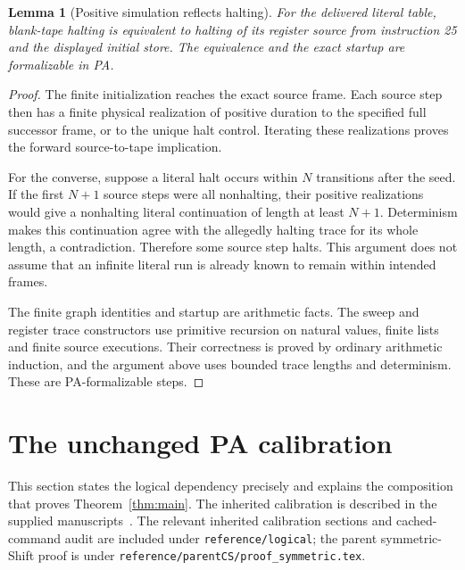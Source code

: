 \documentclass[11pt,letterpaper]{article}
\newcommand{\file}[1]{\texttt{\nolinkurl{#1}}}
\newtheorem{lemma}[theorem]{Lemma}
\begin{document}
\begin{lemma}[Positive simulation reflects halting]\label{lem:reflect}
For the delivered literal table, blank-tape halting is equivalent to
halting of its register source from instruction 25 and the displayed
initial store. The equivalence and the exact startup are formalizable in PA.
\end{lemma}
\begin{proof}
The finite initialization reaches the exact source frame. Each source
step then has a finite physical realization of positive duration to the
specified full successor frame, or to the unique halt control. Iterating
these realizations proves the forward source-to-tape implication.

For the converse, suppose a literal halt occurs within $N$ transitions
after the seed. If the first $N+1$ source steps were all nonhalting, their
positive realizations would give a nonhalting literal continuation of
length at least $N+1$. Determinism makes this continuation agree with the
allegedly halting trace for its whole length, a contradiction. Therefore
some source step halts. This argument does not assume that an infinite
literal run is already known to remain within intended frames.

The finite graph identities and startup are arithmetic facts. The sweep
and register trace constructors use primitive recursion on natural
values, finite lists and finite source executions. Their correctness is
proved by ordinary arithmetic induction, and the argument above uses
bounded trace lengths and determinism. These are PA-formalizable steps.
\end{proof}

\section{The unchanged PA calibration}
\label{sec:calibration}
This section states the logical dependency precisely and explains the
composition that proves Theorem~\ref{thm:main}. The inherited calibration is described in the supplied manuscripts~\cite{calibration,chang,cs}. The relevant inherited
calibration sections and cached-command audit are included under
\file{reference/logical}; the parent
symmetric-Shift proof is under \file{reference/parentCS/proof_symmetric.tex}.
\end{document}
